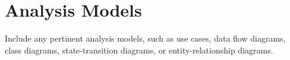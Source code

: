 \chapter{Analysis Models}

Include any pertinent analysis models, such as use cases, data flow
diagrams, class diagrams, state-transition diagrams, or
entity-relationship diagrams.
